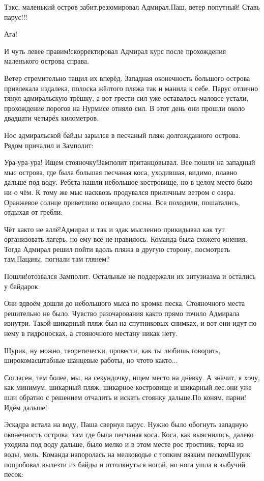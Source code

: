 \diagdash Тэк\sdash с, маленький остров забит.\mdash резюмировал Адмирал.\mdash Паш, ветер попутный! Ставь парус!!!

\diagdash Ага!

\diagdash И чуть левее правим!\mdash скорректировал Адмирал курс после прохождения маленького острова справа.

Ветер стремительно тащил их вперёд. Западная оконечность большого острова привлекала издалека, полоска жёлтого пляжа так и манила к себе. Парус отлично тянул адмиральскую трёшку, а вот грести сил уже оставалось мало\mdash все устали, прохождение порогов на Нурмисе отняло сил. В этот день они прошли около двадцати четырёх километров.

Нос адмиральской байды зарылся в песчаный пляж долгожданного острова. Рядом причалил и Замполит:

\diagdash Ура-ура-ура! Ищем стояночку!\mdash Замполит пританцовывал. Все пошли на западный мыс острова, где была большая песчаная коса, уходившая, видимо, плавно дальше под воду. Ребята нашли небольшое костровище, но в целом место было ни о чём. К тому же мыс насквозь продувался приличным ветром с озера. Оранжевое солнце приветливо освещало сосны. Все походили, пошатались, отдыхая от гребли:

\diagdash Чёт как\sdash то не аллё!\mdash Адмирал и так и эдак мысленно прикидывал как тут организовать лагерь, но ему всё не нравилось. Команда была схожего мнения. Тогда Адмирал решил пойти вдоль пляжа в другую сторону, посмотреть там.\mdash Пацаны, погнали там глянем?

\diagdash Пошли!\mdash отозвался Замполит. Остальные не поддержали их энтузиазма и остались у байдарок.

Они вдвоём дошли до небольшого мыса по кромке песка. Стояночного места решительно не было. Чувство разочарования как\sdash то прямо точило Адмирала изнутри. Такой шикарный пляж был на спутниковых снимках, и вот они идут по нему в гидроносках, а стояночного места\mdash ну никак нету.

\diagdash Шурик, ну можно, теоретически, провести, как ты любишь говорить, широкомасштабные шанцевые работы, но что\sdash то как\sdash то$\ldots$

\diagdash Согласен, тем более, мы, на секундочку, ищем место на днёвку. А значит, я хочу, как минимум, шикарный пляж, шикарное костровище и шикарный лес.\mdash они уже шли обратно с решением отчалить и искать стоянку дальше.\mdash По коням, парни! Идём дальше!

Эскадра встала на воду, Паша свернул парус. Нужно было обогнуть западную оконечность острова, там где была песчаная коса. Коса, как выяснилось, далеко уходила под воду дальше, было мелко и в этом месте рос тростник, торча из воды, мель. Команда напоролась на мелководье с топким вязким песком\mdash Шурик попробовал вылезти из байды и оттолкнуться ногой, но нога ушла в зыбучий песок:

